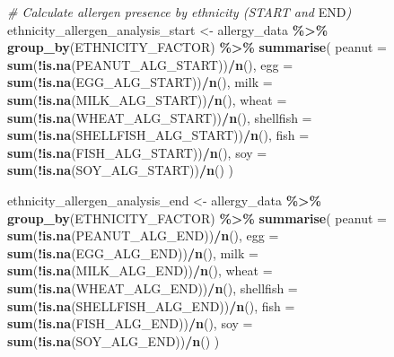 \documentclass[
]{article}
\newenvironment{Shaded}{\begin{snugshade}}{\end{snugshade}}
\newcommand{\AttributeTok}[1]{\textcolor[rgb]{0.13,0.29,0.53}{#1}}
\newcommand{\CommentTok}[1]{\textcolor[rgb]{0.56,0.35,0.01}{\textit{#1}}}
\newcommand{\FunctionTok}[1]{\textcolor[rgb]{0.13,0.29,0.53}{\textbf{#1}}}
\newcommand{\NormalTok}[1]{#1}
\newcommand{\OtherTok}[1]{\textcolor[rgb]{0.56,0.35,0.01}{#1}}
\newcommand{\RegionMarkerTok}[1]{#1}
\newcommand{\SpecialCharTok}[1]{\textcolor[rgb]{0.81,0.36,0.00}{\textbf{#1}}}
\begin{document}
\begin{Shaded}
\begin{Highlighting}[]
\CommentTok{\# Calculate allergen presence by ethnicity (START and }\RegionMarkerTok{END}\CommentTok{)}
\NormalTok{ethnicity\_allergen\_analysis\_start }\OtherTok{\textless{}{-}}\NormalTok{ allergy\_data }\SpecialCharTok{\%\textgreater{}\%}
  \FunctionTok{group\_by}\NormalTok{(ETHNICITY\_FACTOR) }\SpecialCharTok{\%\textgreater{}\%}
  \FunctionTok{summarise}\NormalTok{(}
    \AttributeTok{peanut =} \FunctionTok{sum}\NormalTok{(}\SpecialCharTok{!}\FunctionTok{is.na}\NormalTok{(PEANUT\_ALG\_START))}\SpecialCharTok{/}\FunctionTok{n}\NormalTok{(),}
    \AttributeTok{egg =} \FunctionTok{sum}\NormalTok{(}\SpecialCharTok{!}\FunctionTok{is.na}\NormalTok{(EGG\_ALG\_START))}\SpecialCharTok{/}\FunctionTok{n}\NormalTok{(),}
    \AttributeTok{milk =} \FunctionTok{sum}\NormalTok{(}\SpecialCharTok{!}\FunctionTok{is.na}\NormalTok{(MILK\_ALG\_START))}\SpecialCharTok{/}\FunctionTok{n}\NormalTok{(),}
    \AttributeTok{wheat =} \FunctionTok{sum}\NormalTok{(}\SpecialCharTok{!}\FunctionTok{is.na}\NormalTok{(WHEAT\_ALG\_START))}\SpecialCharTok{/}\FunctionTok{n}\NormalTok{(),}
    \AttributeTok{shellfish =} \FunctionTok{sum}\NormalTok{(}\SpecialCharTok{!}\FunctionTok{is.na}\NormalTok{(SHELLFISH\_ALG\_START))}\SpecialCharTok{/}\FunctionTok{n}\NormalTok{(),}
    \AttributeTok{fish =} \FunctionTok{sum}\NormalTok{(}\SpecialCharTok{!}\FunctionTok{is.na}\NormalTok{(FISH\_ALG\_START))}\SpecialCharTok{/}\FunctionTok{n}\NormalTok{(),}
    \AttributeTok{soy =} \FunctionTok{sum}\NormalTok{(}\SpecialCharTok{!}\FunctionTok{is.na}\NormalTok{(SOY\_ALG\_START))}\SpecialCharTok{/}\FunctionTok{n}\NormalTok{()}
\NormalTok{  )}

\NormalTok{ethnicity\_allergen\_analysis\_end }\OtherTok{\textless{}{-}}\NormalTok{ allergy\_data }\SpecialCharTok{\%\textgreater{}\%}
  \FunctionTok{group\_by}\NormalTok{(ETHNICITY\_FACTOR) }\SpecialCharTok{\%\textgreater{}\%}
  \FunctionTok{summarise}\NormalTok{(}
    \AttributeTok{peanut =} \FunctionTok{sum}\NormalTok{(}\SpecialCharTok{!}\FunctionTok{is.na}\NormalTok{(PEANUT\_ALG\_END))}\SpecialCharTok{/}\FunctionTok{n}\NormalTok{(),}
    \AttributeTok{egg =} \FunctionTok{sum}\NormalTok{(}\SpecialCharTok{!}\FunctionTok{is.na}\NormalTok{(EGG\_ALG\_END))}\SpecialCharTok{/}\FunctionTok{n}\NormalTok{(),}
    \AttributeTok{milk =} \FunctionTok{sum}\NormalTok{(}\SpecialCharTok{!}\FunctionTok{is.na}\NormalTok{(MILK\_ALG\_END))}\SpecialCharTok{/}\FunctionTok{n}\NormalTok{(),}
    \AttributeTok{wheat =} \FunctionTok{sum}\NormalTok{(}\SpecialCharTok{!}\FunctionTok{is.na}\NormalTok{(WHEAT\_ALG\_END))}\SpecialCharTok{/}\FunctionTok{n}\NormalTok{(),}
    \AttributeTok{shellfish =} \FunctionTok{sum}\NormalTok{(}\SpecialCharTok{!}\FunctionTok{is.na}\NormalTok{(SHELLFISH\_ALG\_END))}\SpecialCharTok{/}\FunctionTok{n}\NormalTok{(),}
    \AttributeTok{fish =} \FunctionTok{sum}\NormalTok{(}\SpecialCharTok{!}\FunctionTok{is.na}\NormalTok{(FISH\_ALG\_END))}\SpecialCharTok{/}\FunctionTok{n}\NormalTok{(),}
    \AttributeTok{soy =} \FunctionTok{sum}\NormalTok{(}\SpecialCharTok{!}\FunctionTok{is.na}\NormalTok{(SOY\_ALG\_END))}\SpecialCharTok{/}\FunctionTok{n}\NormalTok{()}
\NormalTok{  )}


\end{Highlighting}
\end{Shaded}
\end{document}

